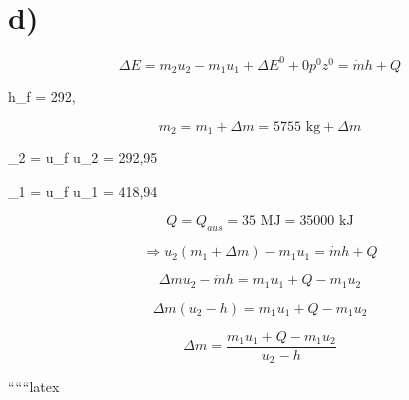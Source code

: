 

\section*{d)}



\[
\Delta E = m_2 u_2 - m_1 u_1 + \Delta E^0 + 0 p^0 z^0 = \dot{m} h + Q
\]

 h_f = 292,  

\[
m_2 = m_1 + \Delta m = 5755 \text{ kg} + \Delta m
\]

_2  = u_f  u_2 = 292,95 

_1  = u_f  u_1 = 418,94 

\[
Q = Q_{aus} = 35 \text{ MJ} = 35000 \text{ kJ}
\]

\[
\Rightarrow u_2 (m_1 + \Delta m) - m_1 u_1 = \dot{m} h + Q
\]

\[
\Delta m u_2 - \dot{m} h = m_1 u_1 + Q - m_1 u_2
\]

\[
\Delta m (u_2 - h) = m_1 u_1 + Q - m_1 u_2
\]

\[
\Delta m = \frac{m_1 u_1 + Q - m_1 u_2}{u_2 - h}
\]

``````latex
